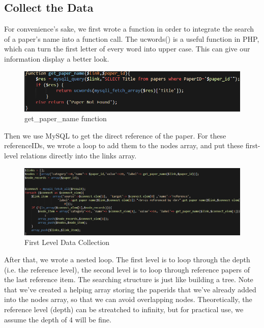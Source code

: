 \documentclass{book}
\begin{document}
\subsection{Collect the Data}

For convenience's sake, we first wrote a function in order to integrate the search of a paper's name into a function call. The ucwords() is a useful function in PHP, which can turn the first letter of every word into upper case. This can give our information display a better look.

\begin{figure}[H]
\centering
\includegraphics[scale=0.55]{img/zlt_rel_code_func.png}
\caption{get\_paper\_name function}
\end{figure}

Then we use MySQL to get the direct reference of the paper. For these referenceIDs, we wrote a loop to add them to the nodes array, and put these first-level relations directly into the links array.

\begin{figure}[H]
\centering
\includegraphics[scale=0.55]{img/zlt_rel_code_lev1.png}
\caption{First Level Data Collection}
\end{figure}

After that, we wrote a nested loop. The first level is to loop through the depth (i.e. the reference level), the second level is to loop through reference papers of the last reference item. The searching structure is just like building a tree. Note that we've created a helping array storing the paperids that we've already added into the nodes array, so that we can avoid overlapping nodes. Theoretically, the reference level (depth) can be streatched to infinity, but for practical use, we assume the depth of 4 will be fine.
\end{document}
